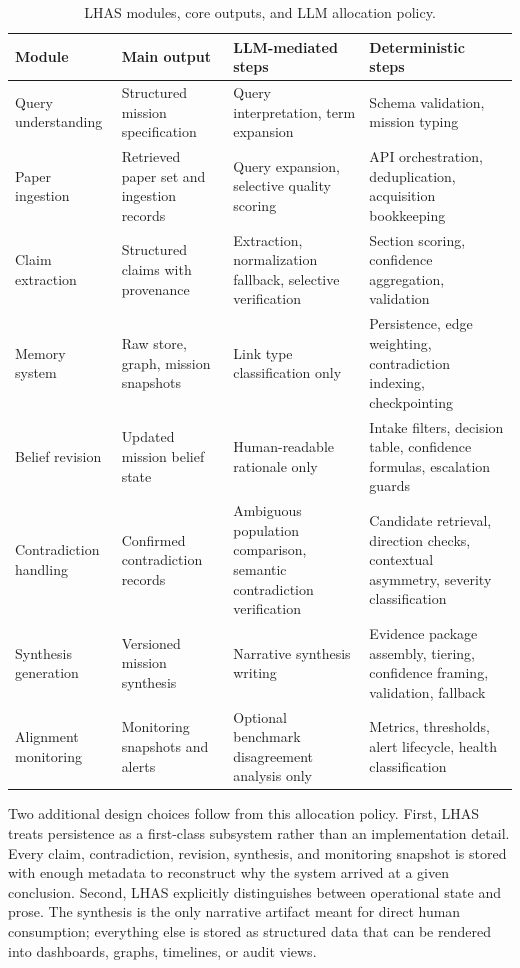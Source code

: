 \documentclass[manuscript,screen,review]{jair}
\begin{document}
\begin{table}[t]
  \caption{LHAS modules, core outputs, and LLM allocation policy.}
  \label{tab:modules}
  \centering
  \begin{tabularx}{\textwidth}{@{}>{\raggedright\arraybackslash}p{2.4cm}>{\raggedright\arraybackslash}X>{\raggedright\arraybackslash}p{3.8cm}>{\raggedright\arraybackslash}p{3.6cm}@{}}
    \toprule
    Module & Main output & LLM-mediated steps & Deterministic steps \\
    \midrule
    Query understanding & Structured mission specification & Query interpretation, term expansion & Schema validation, mission typing \\
    Paper ingestion & Retrieved paper set and ingestion records & Query expansion, selective quality scoring & API orchestration, deduplication, acquisition bookkeeping \\
    Claim extraction & Structured claims with provenance & Extraction, normalization fallback, selective verification & Section scoring, confidence aggregation, validation \\
    Memory system & Raw store, graph, mission snapshots & Link type classification only & Persistence, edge weighting, contradiction indexing, checkpointing \\
    Belief revision & Updated mission belief state & Human-readable rationale only & Intake filters, decision table, confidence formulas, escalation guards \\
    Contradiction handling & Confirmed contradiction records & Ambiguous population comparison, semantic contradiction verification & Candidate retrieval, direction checks, contextual asymmetry, severity classification \\
    Synthesis generation & Versioned mission synthesis & Narrative synthesis writing & Evidence package assembly, tiering, confidence framing, validation, fallback \\
    Alignment monitoring & Monitoring snapshots and alerts & Optional benchmark disagreement analysis only & Metrics, thresholds, alert lifecycle, health classification \\
    \bottomrule
  \end{tabularx}
\end{table}

Two additional design choices follow from this allocation policy. First, LHAS treats persistence as a first-class subsystem rather than an implementation detail. Every claim, contradiction, revision, synthesis, and monitoring snapshot is stored with enough metadata to reconstruct why the system arrived at a given conclusion. Second, LHAS explicitly distinguishes between operational state and prose. The synthesis is the only narrative artifact meant for direct human consumption; everything else is stored as structured data that can be rendered into dashboards, graphs, timelines, or audit views.
\end{document}

